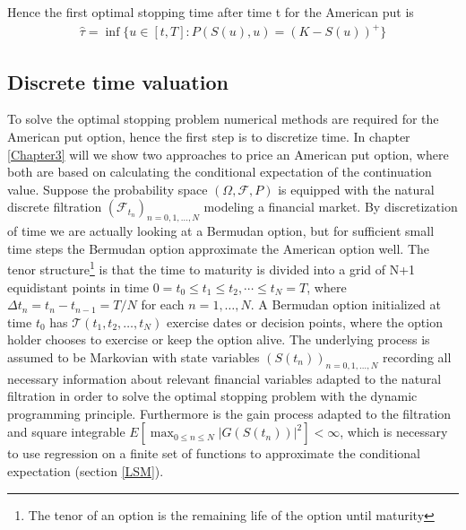 Hence the first optimal stopping time after time t for the American put is
\begin{equation*}
\begin{split}
\hat{\tau}= \inf\{u \in [t,T] : P(S(u),u) = (K-S(u))^+ \}
\end{split}
\end{equation*}



\subsection{Discrete time valuation}\label{DiscreteValueFramework}
To solve the optimal stopping problem numerical methods are required for the American put option, hence the first step is to discretize time. In chapter \ref{Chapter3} will we show two approaches to price an American put option, where both are based on calculating the conditional expectation of the continuation value. Suppose the probability space $(\Omega, \mathcal{F}, P)$ is equipped with the natural discrete filtration $(\mathcal{F}_{t_n})_{n=0,1,\ldots,N}$ modeling a financial market. By discretization of time we are actually looking at a Bermudan option, but for sufficient small time steps the Bermudan option approximate the American option well. The tenor structure\footnote{The tenor of an option is the remaining life of the option until maturity} is that the time to maturity is divided into a grid of N+1 equidistant points in time $0=t_0\leq t_1\leq t_2, \cdots \leq t_N=T$, where $\Delta t_n = t_n-t_{n-1}=T/N$ for each $n=1, \ldots, N$. A Bermudan option initialized at time $t_0$ has $\mathcal{T}(t_1,t_2,\ldots,t_N)$ exercise dates or decision points, where the option holder chooses to exercise or keep the option alive. The underlying process is assumed to be Markovian with state variables $(S(t_n))_{n=0,1,\ldots,N}$ recording all necessary information about relevant financial variables adapted to the natural filtration in order to solve the optimal stopping problem with the dynamic programming principle. Furthermore is the gain process adapted to the filtration and square integrable $E[\max_{0\leq n \leq N} |G(S(t_n))|^2]<\infty$, which is necessary to use regression on a finite set of functions to approximate the conditional expectation (section \ref{LSM}).\\

